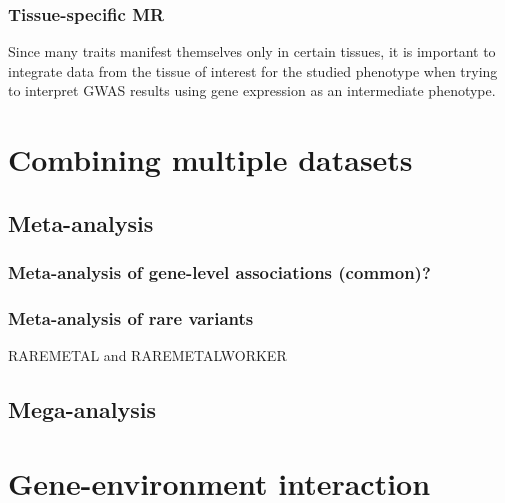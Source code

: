 \documentclass[]{book}
\theoremstyle{definition}
\theoremstyle{definition}
\theoremstyle{definition}
\theoremstyle{remark}
\begin{document}
\subsection{Tissue-specific MR}\label{tissue-specific-mr}

Since many traits manifest themselves only in certain tissues, it is
important to integrate data from the tissue of interest for the studied
phenotype when trying to interpret GWAS results using gene expression as
an intermediate phenotype.

\chapter{Combining multiple datasets}\label{combining-multiple-datasets}

\section{Meta-analysis}\label{meta-analysis}

\subsection{Meta-analysis of gene-level associations
(common)?}\label{meta-analysis-of-gene-level-associations-common}

\subsection{Meta-analysis of rare
variants}\label{meta-analysis-of-rare-variants}

RAREMETAL and RAREMETALWORKER

\section{Mega-analysis}\label{mega-analysis}

\chapter{Gene-environment
interaction}\label{gene-environment-interaction}
\end{document}
